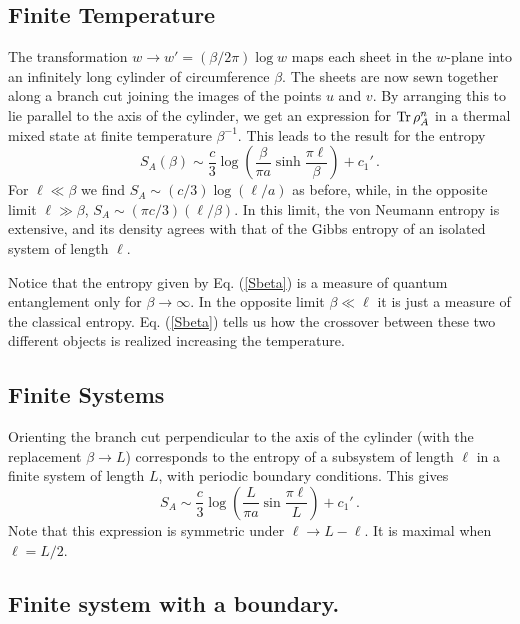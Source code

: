 \documentclass[12pt]{article}
\begin{document}
\subsection{Finite Temperature}

The transformation $w\to w'=(\beta/2\pi)\log w$ maps each sheet in
the $w$-plane into an infinitely long cylinder of circumference $\beta$. 
The sheets are now sewn together along a branch cut joining the images
of the points $u$ and $v$. By arranging this to lie parallel to the axis
of the cylinder, we get an expression for ${\rm Tr}\,\rho_{A}^n$
in a thermal mixed state at finite temperature $\beta^{-1}$. 
This leads to the result for the entropy
\begin{equation}
S_A(\beta)\sim
\frac{c}{3}\log\left(\frac{\beta}{\pi a}\sinh\frac{\pi\ell}{\beta}\right)+c_1'\,.
\label{Sbeta}
\end{equation}
For $\ell\ll\beta$ we find $S_A\sim(c/3)\log(\ell/a)$ as before, while, in the
opposite limit $\ell\gg\beta$, $S_A\sim(\pi c/3)(\ell/\beta)$. In this
limit, the von Neumann entropy is extensive, and its density agrees with
that of the Gibbs entropy of an isolated system of length $\ell$.

Notice that the entropy given by Eq. (\ref{Sbeta}) is a measure of quantum
entanglement only for $\beta\to\infty$. In the opposite limit $\beta\ll\ell$
it is just a measure of the classical entropy. Eq. (\ref{Sbeta})
tells us how the crossover between these two different objects is realized
increasing the temperature.

\subsection{Finite Systems}

Orienting the branch cut perpendicular to the axis
of the cylinder (with the replacement $\beta\to L$) corresponds
to the entropy of a subsystem of length $\ell$ in a finite system of
length $L$, with periodic boundary conditions. 
This gives 
\begin{equation}
S_A\sim \frac{c}{3}\log\left(\frac{L}{\pi a}\sin\frac{\pi\ell}{L}\right)+c_1'\,.
\end{equation}
Note that this expression is symmetric under $\ell\to L-\ell$. It is
maximal when $\ell=L/2$. 

\subsection{Finite system with a boundary.}
\end{document}
